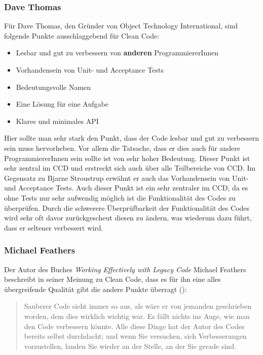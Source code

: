 \subsubsection{Dave Thomas}
Für Dave Thomas, den Gründer von Object Technology International,  sind folgende Punkte ausschlaggebend für Clean Code:

\begin{itemize}
	\item Lesbar und gut zu verbessern von \textbf{anderen} ProgrammiererInnen
	\item Vorhandensein von Unit- und Acceptance Tests
	\item Bedeutungsvolle Namen
	\item Eine Lösung für eine Aufgabe
	\item Klares und minimales API
\end{itemize}

Hier sollte man sehr stark den Punkt, dass der Code lesbar und gut zu verbessern sein muss hervorheben. Vor allem die Tatsache, dass er dies auch für andere ProgrammiererInnen sein sollte ist von sehr hoher Bedeutung. Dieser Punkt ist sehr zentral im CCD und erstreckt sich auch über alle Teilbereiche von CCD. Im Gegensatz zu Bjarne Stroustrup erwähnt er auch das Vorhandensein von Unit- und Acceptance Tests. Auch dieser Punkt ist ein sehr zentraler im CCD, da es ohne Tests nur sehr aufwendig möglich ist die Funktionalität des Codes zu überprüfen. Durch die schwerere Überprüfbarkeit der Funktionalität des Codes wird sehr oft davor zurückgescheut diesen zu ändern, was wiederum dazu führt, dass er seltener verbessert wird.

\subsubsection{Michael Feathers}
Der Autor des Buches \textit{Working Effectively with Legacy Code} \cite{Feathers2013} Michael Feathers beschreibt in seiner Meinung zu Clean Code, dass es für ihn eine alles übergreifende Qualität gibt die andere Punkte überragt (\cite[Seite 36]{Martin2008}): 

\begin{quotation}
	Sauberer Code sieht immer so aus, als wäre er von jemanden geschrieben worden, dem dies wirklich wichtig war. Es fällt nichts ins Auge, wie man den Code verbessern könnte. Alle diese Dinge hat der Autor des Codes bereits selbst durchdacht; und wenn Sie versuchen, sich Verbesserungen vorzustellen, landen Sie wieder an der Stelle, an der Sie gerade sind.
\end{quotation}


